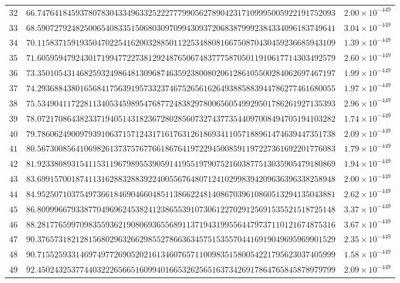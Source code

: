 \documentclass[12pt,reqno]{amsart}
\theoremstyle{remark}
\begin{document}
\begin{longtable}{clc}
$32$ & $66.7476418459378078304334963325222777990562789042317109995005922191752093$ & $2.00\times 10^{-449}$ \\
$33$ & $68.5907279248250065408335150680309709943093720683879992384334096183749641$ & $3.04\times 10^{-449}$ \\
$34$ & $70.1158371591935047022541620032885011225348808166750870430459236685943109$ & $1.39\times 10^{-449}$ \\
$35$ & $71.6059594792430171994772273812924876506748377758705011910617714303492579$ & $2.60\times 10^{-449}$ \\
$36$ & $73.3501054314682593249864813096874635923800802061286105500284062697467197$ & $1.99\times 10^{-449}$ \\
$37$ & $74.2936884380165684175639195733237467526561626493885883944786277461680055$ & $1.97\times 10^{-449}$ \\
$38$ & $75.5349041172281134053459895476877248382978006560549929501786261927135393$ & $2.96\times 10^{-449}$ \\
$39$ & $78.0721708643823371940514318236728028560732743773544097008494705194103282$ & $1.74\times 10^{-449}$ \\
$40$ & $79.7860624900979391063715712431716176312618693411057188961474639447351738$ & $2.09\times 10^{-449}$ \\
$41$ & $80.5673008564106982613737576776618676419722945008591197227361692201776083$ & $1.79\times 10^{-449}$ \\
$42$ & $81.9233808931541153119679895539059141955197907521603877513035905479180869$ & $1.94\times 10^{-449}$ \\
$43$ & $83.6991570018741131628832883922400556764807124102998394209636396338258948$ & $2.00\times 10^{-449}$ \\
$44$ & $84.9525071037549736618469046604851138662248140867039610860513294135043881$ & $2.62\times 10^{-449}$ \\
$45$ & $86.8099966793387704969624538241238655391073061227029125691535521518725148$ & $3.37\times 10^{-449}$ \\
$46$ & $88.2817765997098355936219080693655689113719431995564479737110121674875316$ & $3.67\times 10^{-449}$ \\
$47$ & $90.3765731821281568029632662985527866363457515355704416919049695969901529$ & $2.35\times 10^{-449}$ \\
$48$ & $90.7155259331469749772690520216134607657110098351580054221795623037405999$ & $1.58\times 10^{-449}$ \\
$49$ & $92.4502432537744032226566516099401665326256516373426917864765845878979799$ & $2.09\times 10^{-449}$ \\

\end{longtable}
\end{document}
